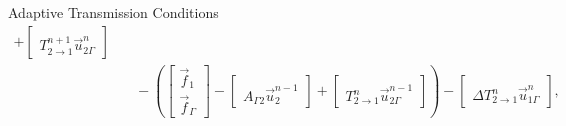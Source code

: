 \documentclass{beamer}
\begin{document}
\begin{frame}{Adaptive Transmission Conditions}
\begin{align*}
	+ \begin{bmatrix} ~ \\ T_{2 \to 1}^{n+1} \vec{u}_{2 \Gamma}^n \end{bmatrix} \\
	& \quad - \left ( \begin{bmatrix} \vec{f}_1 \\ \vec{f}_\Gamma \end{bmatrix}
	- \begin{bmatrix} ~ \\ A_{\Gamma 2} \vec{u}_2^{n-1} \end{bmatrix}
	+ \begin{bmatrix} ~ \\ T_{2 \to 1}^n \vec{u}_{2 \Gamma}^{n-1} \end{bmatrix} \right )
	- \begin{bmatrix} ~ \\ \Delta T_{2 \to 1}^n \vec{u}_{1 \Gamma}^{n} \end{bmatrix},
\end{align*}
\end{frame}
\end{document}
